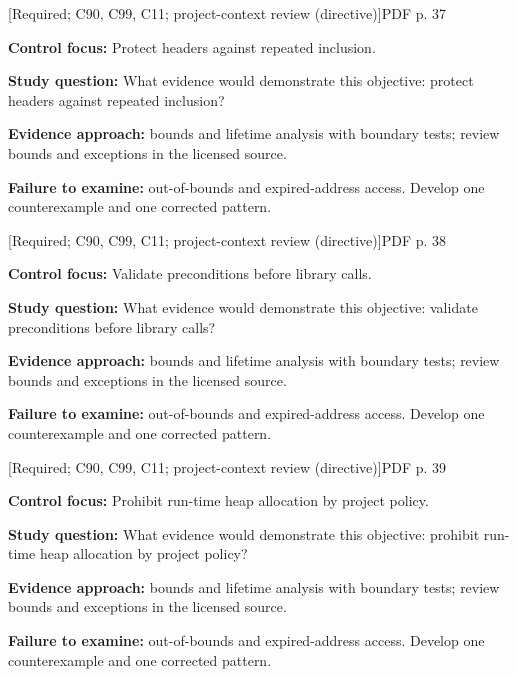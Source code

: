 \documentclass[10pt,letterpaper]{article}
\begin{document}
 \textsf{\footnotesize [Required; C90, C99, C11; project-context review (directive)]}\hfill{\footnotesize PDF p. 37}\par
\textbf{Control focus:} Protect headers against repeated inclusion.\par
\textbf{Study question:} What evidence would demonstrate this objective: protect headers against repeated inclusion?\par
\textbf{Evidence approach:} bounds and lifetime analysis with boundary tests; review bounds and exceptions in the licensed source.\par
\textbf{Failure to examine:} out-of-bounds and expired-address access. Develop one counterexample and one corrected pattern.\par
\smallskip
{}
 \textsf{\footnotesize [Required; C90, C99, C11; project-context review (directive)]}\hfill{\footnotesize PDF p. 38}\par
\textbf{Control focus:} Validate preconditions before library calls.\par
\textbf{Study question:} What evidence would demonstrate this objective: validate preconditions before library calls?\par
\textbf{Evidence approach:} bounds and lifetime analysis with boundary tests; review bounds and exceptions in the licensed source.\par
\textbf{Failure to examine:} out-of-bounds and expired-address access. Develop one counterexample and one corrected pattern.\par
\smallskip
{}
 \textsf{\footnotesize [Required; C90, C99, C11; project-context review (directive)]}\hfill{\footnotesize PDF p. 39}\par
\textbf{Control focus:} Prohibit run-time heap allocation by project policy.\par
\textbf{Study question:} What evidence would demonstrate this objective: prohibit run-time heap allocation by project policy?\par
\textbf{Evidence approach:} bounds and lifetime analysis with boundary tests; review bounds and exceptions in the licensed source.\par
\textbf{Failure to examine:} out-of-bounds and expired-address access. Develop one counterexample and one corrected pattern.\par
\smallskip
{}
\end{document}
